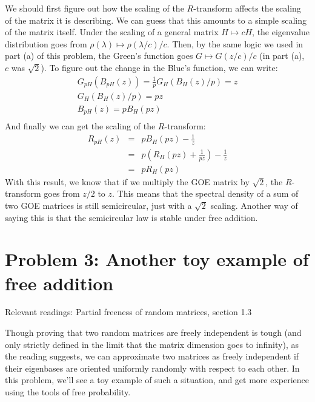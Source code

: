 \documentclass[a4paper]{article}
\begin{document}
\begin{enumerate}[label=(\alph*)]
\begin{tcolorbox}
We should first figure out how the scaling of the $R$-transform affects the scaling of the matrix it is describing.  We can guess that this amounts to a simple scaling of the matrix itself.  Under the scaling of a general matrix $H \mapsto cH$, the eigenvalue distribution goes from $\rho(\lambda) \mapsto \rho(\lambda/c) /c $.  Then, by the same logic we used in part (a) of this problem, the Green's function goes $G \mapsto G(z/c)/c$ (in part (a), $c$ was $\sqrt{2}$).  To figure out the change in the Blue's function, we can write:
\begin{eqnarray}
    G_{pH}(B_{pH}(z)) = \frac{1}{p} G_{H}(B_{H}(z)/p) = z \\
     G_{H}(B_{H}(z)/p) = pz \\
     B_{pH}(z) = p B_H(pz) \\
\end{eqnarray}
And finally we can get the scaling of the $R$-transform:
\begin{eqnarray}
    R_{pH}(z) &=& pB_H(pz) - \frac{1}{z} \\
    &=& p\left( R_H(pz) + \frac{1}{pz} \right) - \frac{1}{z} \\
    &=& p R_H(pz)
\end{eqnarray}
With this result, we know that if we multiply the GOE matrix by $\sqrt{2}$, the $R$-transform goes from $z/2$ to $z$.  This means that the spectral density of a sum of two GOE matrices is still semicircular, just with a $\sqrt{2}$ scaling.  Another way of saying this is that the semicircular law is stable under free addition.
\end{tcolorbox}

\end{enumerate}

\section*{Problem 3: Another toy example of free addition}

Relevant readings: Partial freeness of random matrices, section 1.3

Though proving that two random matrices are freely independent is tough (and only strictly defined in the limit that the matrix dimension goes to infinity), as the reading suggests, we can approximate two matrices as freely independent if their eigenbases are oriented uniformly randomly with respect to each other.  In this problem, we'll see a toy example of such a situation, and get more experience using the tools of free probability.
\end{document}
